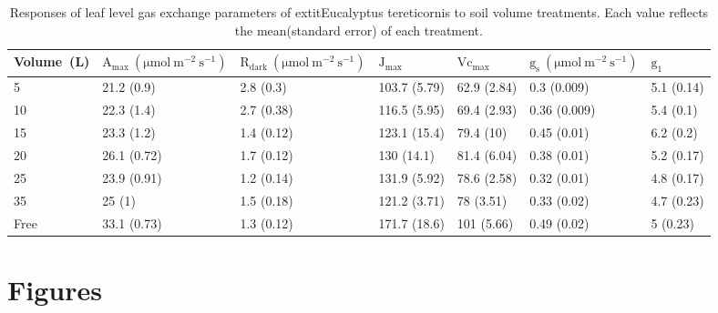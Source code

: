 \documentclass[a4paper]{article}\usepackage[]{graphicx}\usepackage[]{color}
\begin{document}
\begin{table}
\centering
\caption{Responses of leaf level gas exchange parameters of 	extit{Eucalyptus tereticornis} to soil volume treatments. Each value reflects the mean(standard error) of each treatment.} 
\label{table:Table2}
\begin{tabular}{lllllll}
  \hline
	{Volume~(L)} & $\mathrm{A_{max}~(\mu mol~m^{-2}~s^{-1})}$ & $\mathrm{R_{dark}~(\mu mol~m^{-2}~s^{-1})}$ & $\mathrm{J_{max}}$ & $\mathrm{Vc_{max}}$ & $\mathrm{g_s~(\mu mol~m^{-2}~s^{-1})}$ & $\mathrm{g_1}$ \\ 
  \hline
5 & 21.2 (0.9) & 2.8 (0.3) & 103.7 (5.79) & 62.9 (2.84) & 0.3 (0.009) & 5.1 (0.14) \\ 
  10 & 22.3 (1.4) & 2.7 (0.38) & 116.5 (5.95) & 69.4 (2.93) & 0.36 (0.009) & 5.4 (0.1) \\ 
  15 & 23.3 (1.2) & 1.4 (0.12) & 123.1 (15.4) & 79.4 (10) & 0.45 (0.01) & 6.2 (0.2) \\ 
  20 & 26.1 (0.72) & 1.7 (0.12) & 130 (14.1) & 81.4 (6.04) & 0.38 (0.01) & 5.2 (0.17) \\ 
  25 & 23.9 (0.91) & 1.2 (0.14) & 131.9 (5.92) & 78.6 (2.58) & 0.32 (0.01) & 4.8 (0.17) \\ 
  35 & 25 (1) & 1.5 (0.18) & 121.2 (3.71) & 78 (3.51) & 0.33 (0.02) & 4.7 (0.23) \\ 
  Free & 33.1 (0.73) & 1.3 (0.12) & 171.7 (18.6) & 101 (5.66) & 0.49 (0.02) & 5 (0.23) \\ 
   \hline
\end{tabular}
\end{table}






\clearpage
\section*{Figures}
\end{document}
